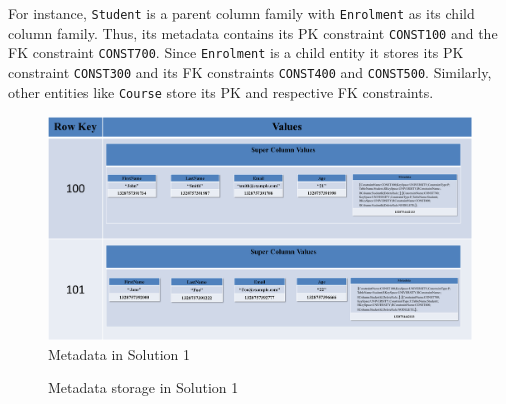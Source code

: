 For instance,  \texttt{Student}  is a parent column family with
\texttt{Enrolment} as its child column family. 
Thus,  its metadata  contains its \ac{PK} constraint \texttt{CONST100} and
the \ac{FK} constraint \texttt{CONST700}.  Since \texttt{Enrolment} is a child entity
it  stores its \ac{PK} constraint \texttt{CONST300} and its \ac{FK} constraints
\texttt{CONST400} and \texttt{CONST500}.  Similarly,  other entities like
\texttt{Course} store its \ac{PK} and respective \ac{FK} constraints. 
	
	\begin{landscape}
	\begin{figure}
	\centering
	\includegraphics[width=1.5\textwidth]{./figure/Solutions/Sol1-MD-ColumnFamily.png}
	\caption{Metadata in Solution 1}
	\end{figure}
	\end{landscape}
	
		\begin{figure}[h] \label{fd:Metadata-Solution1}
			\centering
			\caption{Metadata storage in Solution 1}
		\end{figure}
		

